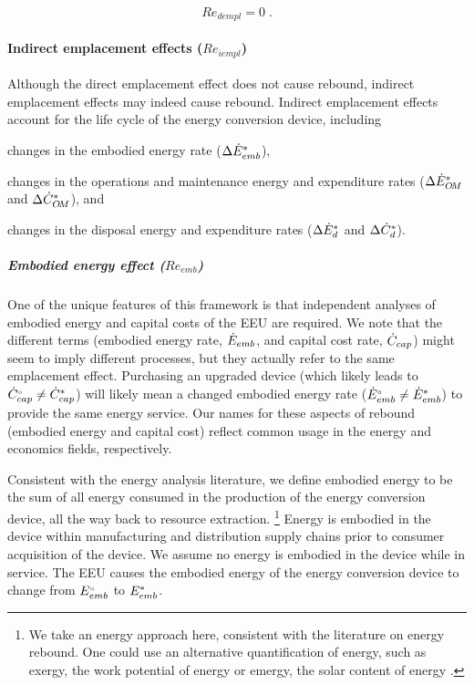 \documentclass[12pt]{article}\usepackage[]{graphicx}\usepackage[]{xcolor}
\begin{document}
\begin{equation} \label{eq:Re_dempl0}
  Re_{dempl} = 0 \; .
\end{equation}


\paragraph{Indirect emplacement effects ($Re_{iempl}$)} 

Although the direct emplacement effect does not cause rebound, 
indirect emplacement effects may indeed cause rebound.
Indirect emplacement effects 
account for the life cycle of the energy conversion device, including 
%
\begin{enumerate*}[label={(\roman*)}]
	
  \item changes in the embodied energy rate ($\Delta {\dot{E}}^*_{emb}$), 
  
  \item changes in the operations and maintenance energy and expenditure rates
        ($\Delta {\dot{E}}^*_{O\!M}$ and $\Delta {\dot{C}}^*_{O\!M}$), and

  \item changes in the disposal energy and expenditure rates
        ($\Delta {\dot{E}}^*_d$ and $\Delta {\dot{C}}^*_d$).
    
\end{enumerate*}


\subparagraph{Embodied energy effect ($Re_{emb}$)} 

One of the unique features of this framework
is that independent analyses of embodied energy and 
capital costs of the EEU are required.
We note that the different terms 
(embodied energy rate, $\dot{E}_{emb}$, and
capital cost rate, $\dot{C}_{cap}$)
might seem to imply different processes, 
but they actually refer to the same emplacement effect.
Purchasing an upgraded device
(which likely leads to ${}{\dot{C}}^{\scriptscriptstyle \circ}_{cap} \neq {\dot{C}}^*_{cap}$)
will likely mean a changed embodied energy rate (${}{\dot{E}}^{\scriptscriptstyle \circ}_{emb} \neq {\dot{E}}^*_{emb}$) 
to provide the same energy service.
Our names for these aspects of rebound (embodied energy and capital cost)
reflect common usage 
in the energy and economics fields, respectively.

Consistent with the energy analysis literature, 
we define embodied energy 
to be the sum of all energy
consumed in the production of the energy conversion device, 
all the way back to resource extraction.%
\footnote{
  We take an energy approach here,
  consistent with the literature on energy rebound. 
  One could use an alternative quantification of energy, 
  such as exergy, the work potential of energy \citep{Sciubba:2007aa} or
  emergy, the solar content of energy \citep{Brown:1996wy}.
}
Energy is embodied in the device within manufacturing and distribution supply chains
prior to consumer acquisition of the device.
We assume no energy is embodied in the device while in service.
The EEU causes the embodied energy of the energy conversion device to change
from ${}{E}^{\scriptscriptstyle \circ}_{emb}$ to ${E}^*_{emb}$.
\end{document}
